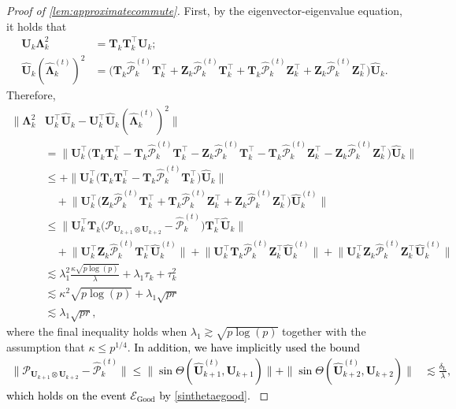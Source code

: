 \documentclass[10pt]{article}
\newcommand{\0}{{\mathbf{0}}}
\newcommand{\1}{{\mathbf{1}}}
\newcommand{\U}{{\mathbf{U}}}
\renewcommand{\t}{^{\top}}
\newcommand{\uhat}{\mathbf{\hat{U}}}
\newcommand{\dl}{\delta_{\mathrm{L}}}
\renewcommand{\hat}{\widehat}
\renewcommand{\hat}{\widehat}
\begin{document}
\begin{proof}[Proof of \cref{lem:approximatecommute}]
First, by the eigenvector-eigenvalue equation, it holds that
\begin{align*}
    \U_k \mathbf{\Lambda}_k^2 &= \mathbf{T}_k \mathbf{T}_k\t \U_k; \\
    \uhat_k (\mathbf{\hat \Lambda}_k^{(t)} )^2 &= \bigg( \mathbf{T}_k \mathcal{\hat P}_k^{(t)} \mathbf{T}_k\t + \mathbf{Z}_k \mathcal{\hat P}_k^{(t)} \mathbf{T}_k\t +\mathbf{T}_k\mathcal{\hat P}_k^{(t)} \mathbf{Z}_k\t +\mathbf{Z}_k\mathcal{\hat P}_k^{(t)} \mathbf{Z}_k\t \bigg) \uhat_k.
\end{align*}
Therefore,
\begin{align*}
    \bigg\| \mathbf{\Lambda}_k^2& \U_k\t \uhat_k - \U_k\t \uhat_k (\mathbf{\hat\Lambda}_k^{(t)})^2 \bigg\|\\
    &=   \bigg\| \U_k\t\bigg( \mathbf{T}_k \mathbf{T}_k\t - \mathbf{T}_k \mathcal{\hat P}_k^{(t)} \mathbf{T}_k\t - \mathbf{Z}_k \mathcal{\hat P}_k^{(t)} \mathbf{T}_k\t -\mathbf{T}_k\mathcal{\hat P}_k^{(t)} \mathbf{Z}_k\t -\mathbf{Z}_k\mathcal{\hat P}_k^{(t)} \mathbf{Z}_k\t \bigg) \uhat_k \bigg\|
    \\
    &\leq +     \bigg\| \U_k\t \bigg( \mathbf{T}_k \mathbf{T}_k\t - \mathbf{T}_k \mathcal{\hat P}_k^{(t)} \mathbf{T}_k\t \bigg) \uhat_k \bigg\|
    \\
    &\quad +  \bigg\| \U_k\t \bigg( \mathbf{Z}_k \mathcal{\hat P}_k^{(t)} \mathbf{T}_k\t + \mathbf{T}_k \mathcal{\hat P}_k^{(t)} \mathbf{Z}_k\t + \mathbf{Z}_k \mathcal{\hat P}_k^{(t)} \mathbf{Z}_k\t \bigg) \uhat_k^{(t)} \bigg\| \\
    &\leq \bigg\| \U_k\t \mathbf{T}_k \bigg( \mathcal{P}_{\U_{k+1} \otimes \U_{k+2}} - \mathcal{\hat P}_k^{(t)} \bigg) \mathbf{T}_k\t \uhat_k \bigg\| \\
    &\quad + \bigg\| \U_k\t \mathbf{Z}_k \mathcal{\hat P}_k^{(t)} \mathbf{T}_k\t \uhat_k^{(t)} \bigg\| + \bigg\| \U_k\t \mathbf{T}_k \mathcal{\hat P}_k^{(t)} \mathbf{Z}_k\t \uhat_k^{(t)} \bigg\| + \bigg\| \U_k\t \mathbf{Z}_k \mathcal{\hat P}_k^{(t)} \mathbf{Z}_k\t \uhat_k^{(t)} \bigg\| \\
    &\lesssim \lambda_1^2 \frac{\kappa \sqrt{p\log(p)}}{\lambda} + \lambda_1 \tau_k + \tau_k^2 \\
    &\lesssim \kappa^2 \sqrt{p\log(p)} + \lambda_1 \sqrt{pr} \\
    &\lesssim \lambda_1 \sqrt{pr},
\end{align*}
where the final inequality holds when $\lambda_1 \gtrsim \sqrt{p\log(p)}$ together with the assumption that $\kappa \leq p^{1/4}$.  \textcolor{black}{In addition, we have implicitly used the bound
\begin{align*}
    \| \mathcal{P}_{{\mathbf{U}_{k+1}\otimes \U_{k+2}}} - \mathcal{\hat P}_k^{(t)} \| \leq \| \sin\Theta(\uhat_{k+1}^{(t)},\U_{k+1}) \| + \| \sin\Theta(\uhat_{k+2}^{(t)},\U_{k+2})\| 
    &\lesssim \frac{\dl}{\lambda},
\end{align*}
which holds on the event $\mathcal{E}_{\mathrm{Good}}$ by \eqref{sinthetaegood}.
}
\end{proof}
\end{document}
